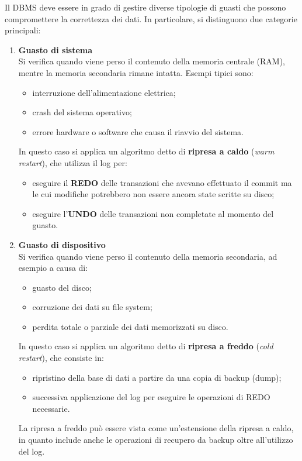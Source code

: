 Il DBMS deve essere in grado di gestire diverse tipologie di guasti che possono compromettere la correttezza dei dati. In particolare, si distinguono due categorie principali:

\begin{enumerate}
	\item \textbf{Guasto di sistema} \\
	Si verifica quando viene perso il contenuto della memoria centrale (RAM), mentre la memoria secondaria rimane intatta. 
	Esempi tipici sono:
	\begin{itemize}
		\item interruzione dell'alimentazione elettrica;
		\item crash del sistema operativo;
		\item errore hardware o software che causa il riavvio del sistema.
	\end{itemize}
	
	In questo caso si applica un algoritmo detto di \textbf{ripresa a caldo} (\textit{warm restart}), che utilizza il log per:
	\begin{itemize}
		\item eseguire il \textbf{REDO} delle transazioni che avevano effettuato il commit ma le cui modifiche potrebbero non essere ancora state scritte su disco;
		\item eseguire l'\textbf{UNDO} delle transazioni non completate al momento del guasto.
	\end{itemize}
	
	\item \textbf{Guasto di dispositivo} \\
	Si verifica quando viene perso il contenuto della memoria secondaria, ad esempio a causa di:
	\begin{itemize}
		\item guasto del disco;
		\item corruzione dei dati su file system;
		\item perdita totale o parziale dei dati memorizzati su disco.
	\end{itemize}
	
	In questo caso si applica un algoritmo detto di \textbf{ripresa a freddo} (\textit{cold restart}), che consiste in:
	\begin{itemize}
		\item ripristino della base di dati a partire da una copia di backup (dump);
		\item successiva applicazione del log per eseguire le operazioni di REDO necessarie.
	\end{itemize}
	
	La ripresa a freddo può essere vista come un'estensione della ripresa a caldo, in quanto include anche le operazioni di recupero da backup oltre all'utilizzo del log.
\end{enumerate}
